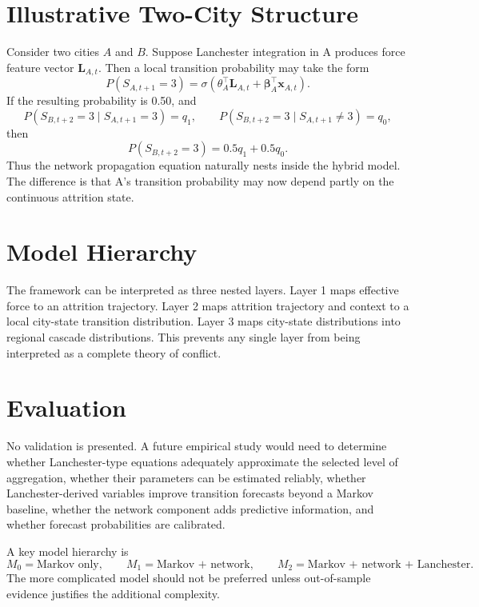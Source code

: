 \documentclass[11pt,letterpaper]{article}
\begin{document}
\section{Illustrative Two-City Structure}
Consider two cities $A$ and $B$. Suppose Lanchester integration in A produces force feature vector $\mathbf{L}_{A,t}$. Then a local transition probability may take the form
\begin{equation}
P(S_{A,t+1}=3)=\sigma(\theta_A^{\top}\mathbf{L}_{A,t}+\boldsymbol{\beta}_A^{\top}\mathbf{x}_{A,t}).
\end{equation}
If the resulting probability is 0.50, and
\begin{equation}
P(S_{B,t+2}=3\mid S_{A,t+1}=3)=q_1,
\qquad
P(S_{B,t+2}=3\mid S_{A,t+1}\neq3)=q_0,
\end{equation}
then
\begin{equation}
P(S_{B,t+2}=3)=0.5q_1+0.5q_0.
\end{equation}
Thus the network propagation equation naturally nests inside the hybrid model. The difference is that A's transition probability may now depend partly on the continuous attrition state.

\section{Model Hierarchy}
The framework can be interpreted as three nested layers. Layer 1 maps effective force to an attrition trajectory. Layer 2 maps attrition trajectory and context to a local city-state transition distribution. Layer 3 maps city-state distributions into regional cascade distributions. This prevents any single layer from being interpreted as a complete theory of conflict.

\section{Evaluation}
No validation is presented. A future empirical study would need to determine whether Lanchester-type equations adequately approximate the selected level of aggregation, whether their parameters can be estimated reliably, whether Lanchester-derived variables improve transition forecasts beyond a Markov baseline, whether the network component adds predictive information, and whether forecast probabilities are calibrated.

A key model hierarchy is
\begin{equation}
M_0=\text{Markov only},\qquad
M_1=\text{Markov + network},\qquad
M_2=\text{Markov + network + Lanchester}.
\end{equation}
The more complicated model should not be preferred unless out-of-sample evidence justifies the additional complexity.
\end{document}

